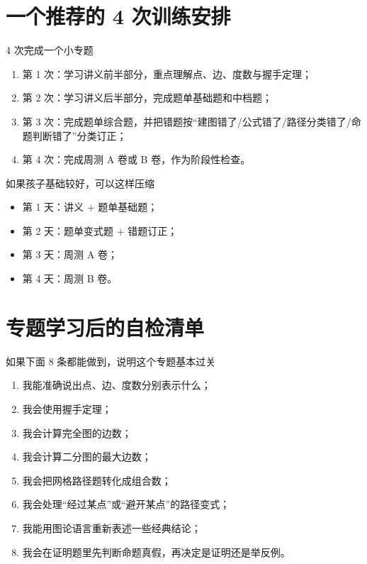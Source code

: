 \documentclass[11pt,a4paper,fontset=fandol]{ctexart}
\begin{document}
\section{一个推荐的 4 次训练安排}

\begin{goalbox}{4 次完成一个小专题}
\begin{enumerate}
  \item 第 1 次：学习讲义前半部分，重点理解点、边、度数与握手定理；
  \item 第 2 次：学习讲义后半部分，完成题单基础题和中档题；
  \item 第 3 次：完成题单综合题，并把错题按“建图错了/公式错了/路径分类错了/命题判断错了”分类订正；
  \item 第 4 次：完成周测 A 卷或 B 卷，作为阶段性检查。
\end{enumerate}
\end{goalbox}

\begin{infobox}{如果孩子基础较好，可以这样压缩}
\begin{itemize}
  \item 第 1 天：讲义 + 题单基础题；
  \item 第 2 天：题单变式题 + 错题订正；
  \item 第 3 天：周测 A 卷；
  \item 第 4 天：周测 B 卷。
\end{itemize}
\end{infobox}

\section{专题学习后的自检清单}

\begin{goalbox}{如果下面 8 条都能做到，说明这个专题基本过关}
\begin{enumerate}
  \item 我能准确说出点、边、度数分别表示什么；
  \item 我会使用握手定理；
  \item 我会计算完全图的边数；
  \item 我会计算二分图的最大边数；
  \item 我会把网格路径题转化成组合数；
  \item 我会处理“经过某点”或“避开某点”的路径变式；
  \item 我能用图论语言重新表述一些经典结论；
  \item 我会在证明题里先判断命题真假，再决定是证明还是举反例。
\end{enumerate}
\end{goalbox}
\end{document}
